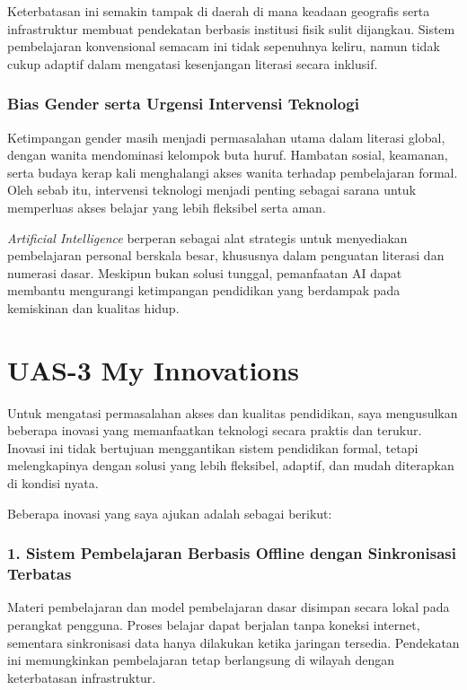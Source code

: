 \documentclass[
  letterpaper,
  DIV=11,
  numbers=noendperiod]{scrreprt}
\begin{document}
Keterbatasan ini semakin tampak di daerah di mana keadaan geografis
serta infrastruktur membuat pendekatan berbasis institusi fisik sulit
dijangkau. Sistem pembelajaran konvensional semacam ini tidak sepenuhnya
keliru, namun tidak cukup adaptif dalam mengatasi kesenjangan literasi
secara inklusif.

\subsection{Bias Gender serta Urgensi Intervensi
Teknologi}\label{bias-gender-serta-urgensi-intervensi-teknologi}

Ketimpangan gender masih menjadi permasalahan utama dalam literasi
global, dengan wanita mendominasi kelompok buta huruf. Hambatan sosial,
keamanan, serta budaya kerap kali menghalangi akses wanita terhadap
pembelajaran formal. Oleh sebab itu, intervensi teknologi menjadi
penting sebagai sarana untuk memperluas akses belajar yang lebih
fleksibel serta aman.

\emph{Artificial Intelligence} berperan sebagai alat strategis untuk
menyediakan pembelajaran personal berskala besar, khususnya dalam
penguatan literasi dan numerasi dasar. Meskipun bukan solusi tunggal,
pemanfaatan AI dapat membantu mengurangi ketimpangan pendidikan yang
berdampak pada kemiskinan dan kualitas hidup.


\chapter{UAS-3 My Innovations}\label{uas-3-my-innovations}

Untuk mengatasi permasalahan akses dan kualitas pendidikan, saya
mengusulkan beberapa inovasi yang memanfaatkan teknologi secara praktis
dan terukur. Inovasi ini tidak bertujuan menggantikan sistem pendidikan
formal, tetapi melengkapinya dengan solusi yang lebih fleksibel,
adaptif, dan mudah diterapkan di kondisi nyata.

Beberapa inovasi yang saya ajukan adalah sebagai berikut:

\subsection{1. Sistem Pembelajaran Berbasis Offline dengan Sinkronisasi
Terbatas}\label{sistem-pembelajaran-berbasis-offline-dengan-sinkronisasi-terbatas}

Materi pembelajaran dan model pembelajaran dasar disimpan secara lokal
pada perangkat pengguna. Proses belajar dapat berjalan tanpa koneksi
internet, sementara sinkronisasi data hanya dilakukan ketika jaringan
tersedia. Pendekatan ini memungkinkan pembelajaran tetap berlangsung di
wilayah dengan keterbatasan infrastruktur.
\end{document}
